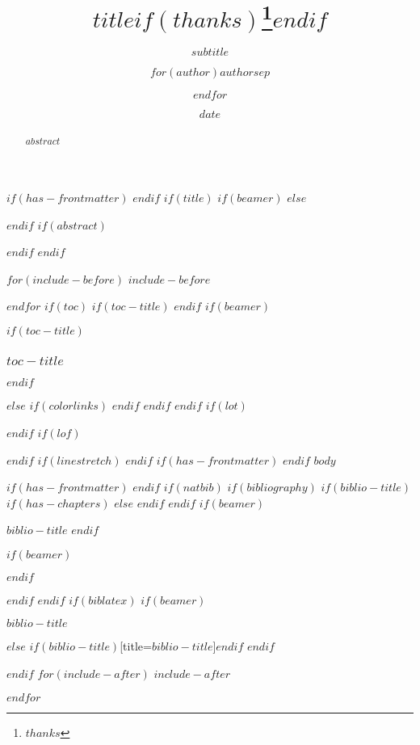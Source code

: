 \documentclass[
$if(fontsize)$
  $fontsize$,
$endif$
$if(lang)$
  $babel-lang$,
$endif$
$if(papersize)$
  $papersize$paper,
$endif$
$if(beamer)$
  ignorenonframetext,
$if(handout)$
  handout,
$endif$
$if(aspectratio)$
  aspectratio=$aspectratio$,
$endif$
$endif$
$for(classoption)$
  $classoption$$sep$,
$endfor$
]{$documentclass$}
\title{$title$$if(thanks)$\thanks{$thanks$}$endif$}
\subtitle{$subtitle$}
\author{$for(author)$$author$$sep$ \and $endfor$}
\date{$date$}
\institute{$for(institute)$$institute$$sep$ \and $endfor$}
\newif\ifbibliography
\begin{document}
$if(has-frontmatter)$
\frontmatter
$endif$
$if(title)$
$if(beamer)$
\frame{\titlepage}
$else$
\maketitle
$endif$
$if(abstract)$
\begin{abstract}
$abstract$
\end{abstract}
$endif$
$endif$

$for(include-before)$
$include-before$

$endfor$
$if(toc)$
$if(toc-title)$
\renewcommand*\contentsname{$toc-title$}
$endif$
$if(beamer)$
\begin{frame}
$if(toc-title)$
  \frametitle{$toc-title$}
$endif$
  \tableofcontents[hideallsubsections]
\end{frame}
$else$
{
$if(colorlinks)$
\hypersetup{linkcolor=$if(toccolor)$$toccolor$$else$$endif$}
$endif$
\setcounter{tocdepth}{$toc-depth$}
\tableofcontents
}
$endif$
$endif$
$if(lot)$
\listoftables
$endif$
$if(lof)$
\listoffigures
$endif$
$if(linestretch)$
$endif$
$if(has-frontmatter)$
\mainmatter
$endif$
$body$

$if(has-frontmatter)$
\backmatter
$endif$
$if(natbib)$
$if(bibliography)$
$if(biblio-title)$
$if(has-chapters)$
\renewcommand\bibname{$biblio-title$}
$else$
\renewcommand\refname{$biblio-title$}
$endif$
$endif$
$if(beamer)$
\begin{frame}[allowframebreaks]{$biblio-title$}
  \bibliographytrue
$endif$
  
$if(beamer)$
\end{frame}
$endif$

$endif$
$endif$
$if(biblatex)$
$if(beamer)$
\begin{frame}[allowframebreaks]{$biblio-title$}
  \bibliographytrue
  \printbibliography[heading=none]
\end{frame}
$else$
\printbibliography$if(biblio-title)$[title=$biblio-title$]$endif$
$endif$

$endif$
$for(include-after)$
$include-after$

$endfor$
\end{document}
